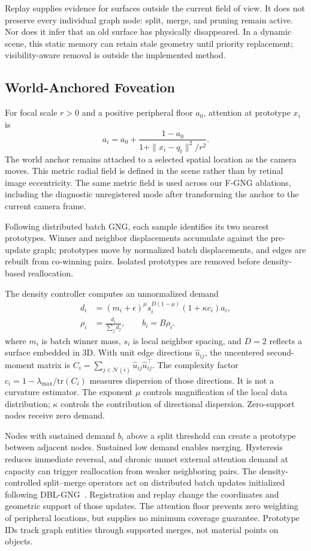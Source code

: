 \documentclass[letterpaper,10pt,conference]{template/ieeeconf}
\begin{document}
Replay supplies evidence for surfaces outside the current field of view. It does not preserve every individual graph node: split, merge, and pruning remain active. Nor does it infer that an old surface has physically disappeared. In a dynamic scene, this static memory can retain stale geometry until priority replacement; visibility-aware removal is outside the implemented method.

\subsection{World-Anchored Foveation}
For focal scale $r>0$ and a positive peripheral floor $a_0$, attention at prototype $x_i$ is
\begin{equation}
 a_i=a_0+\frac{1-a_0}{1+\|x_i-q_t\|^2/r^2}.
\end{equation}
The world anchor remains attached to a selected spatial location as the camera moves. This metric radial field is defined in the scene rather than by retinal image eccentricity. The same metric field is used across our F-GNG ablations, including the diagnostic unregistered mode after transforming the anchor to the current camera frame.

Following distributed batch GNG, each sample identifies its two nearest prototypes. Winner and neighbor displacements accumulate against the pre-update graph; prototypes move by normalized batch displacements, and edges are rebuilt from co-winning pairs. Isolated prototypes are removed before density-based reallocation.

The density controller computes an unnormalized demand
\begin{align}
 d_i&=(m_i+\epsilon)^\mu s_i^{D(1-\mu)}(1+\kappa c_i)a_i,\\
 \rho_i&=\frac{d_i}{\sum_j d_j},\qquad b_i=B\rho_i.
\end{align}
where $m_i$ is batch winner mass, $s_i$ is local neighbor spacing, and $D=2$ reflects a surface embedded in 3D. With unit edge directions $\hat u_{ij}$, the uncentered second-moment matrix is $C_i=\sum_{j\in\mathcal{N}(i)}\hat u_{ij}\hat u_{ij}^{\top}$. The complexity factor $c_i=1-\lambda_{\max}/\mathrm{tr}(C_i)$ measures dispersion of those directions. It is not a curvature estimator. The exponent $\mu$ controls magnification of the local data distribution; $\kappa$ controls the contribution of directional dispersion. Zero-support nodes receive zero demand.

Nodes with sustained demand $b_i$ above a split threshold can create a prototype between adjacent nodes. Sustained low demand enables merging. Hysteresis reduces immediate reversal, and chronic unmet external attention demand at capacity can trigger reallocation from weaker neighboring pairs. The density-controlled split--merge operators act on distributed batch updates initialized following DBL-GNG~\cite{siow2024dbl}. Registration and replay change the coordinates and geometric support of those updates. The attention floor prevents zero weighting of peripheral locations, but supplies no minimum coverage guarantee. Prototype IDs track graph entities through supported merges, not material points on objects.
\end{document}
